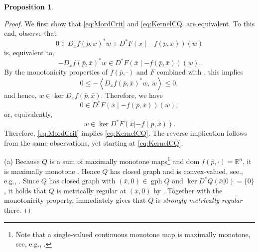 \documentclass[reqno]{amsart}
\newtheorem{proposition}{Proposition}[section]
\numberwithin{equation}{section}
\newcommand{\R}{\mathbb{R}}
\newcommand{\gph}{\operatorname{gph}}
\newcommand{\ip}[2]{\left\langle #1,\, #2\right\rangle}
\newcommand{\dom}{\mathrm{dom}\;}
\begin{document}
\begin{proposition}
\begin{itemize}
\end{itemize}
\end{proposition}

\begin{proof}  We first show that \eqref{eq:MordCrit} and \eqref{eq:KernelCQ} are equivalent. To this end, observe that
\[
0\in D_x f(\bar p,\bar x)^*w+D^*F(\bar x\mid -f(\bar p,\bar x))(w)
\]
is, equivalent to, 
\[
- D_x f(\bar p,\bar x)^*w\in D^*F(\bar x\mid -f(\bar p,\bar x))(w).
\]
By the monotonicity properties of $f(\bar p, \cdot)$ and $F$ combined with \cite[Theorem~2.1]{PR 98}, this implies
\[
0\leq-\ip{ D_x f(\bar p,\bar x)^*w}{w}\leq 0,
\]
and  hence, $w\in \ker  D_x f(\bar p,\bar x)$. Therefore, we have
\[
0\in D^*F(\bar x\mid -f(\bar p,\bar x))(w),
\]
or, equivalently, 
\[
w\in \ker  D^*F(\bar x| -f(\bar p,\bar x)).
\]
Therefore,  \eqref{eq:MordCrit} implies \eqref{eq:KernelCQ}. The  reverse implication follows  from  the same observations, yet starting at \eqref{eq:KernelCQ}.
\smallskip


\noindent
(a) Because $Q$ is a sum of maximally monotone maps\footnote{Note that a single-valued continuous monotone map is maximally monotone, see, e.g., \cite[Example 12.7]{RoW 98}. } and $\dom f(\bar p,\cdot)=\R^n$, it is maximally monotone \cite[Corollary 12.44]{RoW 98}.  Hence $Q$ has closed graph and is convex-valued, see., e.g., \cite[Exercise 12.8]{RoW 98}. Since $Q$ has closed graph with $(\bar{x}, 0) \in \gph Q$ and
    $\ker D^{*}Q(\bar{x}|0) = \{0\}$, it holds that $Q$ is metrically
    regular at $(\bar{x}, 0)$ by .     %
Together with the monotonicity property,   immediately gives
    that $Q$ is \emph{strongly metrically regular} there. 
\smallskip


\end{proof}
\end{document}
